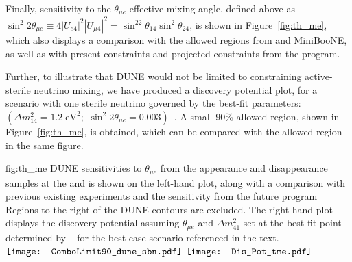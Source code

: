 Finally, sensitivity to the $\theta_{\mu e}$ effective mixing angle, defined above as $\sin^2{2\theta_{\mu e}}\equiv 4|U_{e4}|^2|U_{\mu 4}|^2=\sin^22\theta_{14}\sin^2\theta_{24}$, is shown in Figure~\ref{fig:th_me}, which also displays a comparison with the allowed regions from  and MiniBooNE, as well as with present constraints and projected constraints from the \fnal {} program.

Further, to illustrate that DUNE would not be limited to constraining active-sterile neutrino mixing, we have produced a discovery potential plot, for a scenario with one sterile neutrino governed by the  best-fit parameters: $\left(\Delta m_{14}^2= 1.2\;\text{eV}^2;\,\,\sin^2{2\theta_{\mu e}}=0.003\right)$~\cite{LSNDSterile}. 
A small 90\%  allowed region, shown in Figure~\ref{fig:th_me}, is obtained, which can be compared with the  allowed region in the same figure. 
\begin{dunefigure}
{fig:th_me}
{DUNE sensitivities to $\theta_{\mu e}$ from the appearance and disappearance samples at the  and  is shown on the left-hand plot, along with a comparison with previous existing experiments and the sensitivity from the future  program Regions to the right of the DUNE contours are excluded. The right-hand plot displays the discovery potential assuming $\theta_{\mu e}$ and $\Delta m_{41}^2$ set at the best-fit point determined by ~\cite{LSNDSterile} for the best-case scenario referenced in the text.}
$\vcenter{\hbox{\texttt{[image: ComboLimit90\_dune\_sbn.pdf]}}}$
$\vcenter{\hbox{\texttt{[image: Dis\_Pot\_tme.pdf]}}}$
\end{dunefigure}


